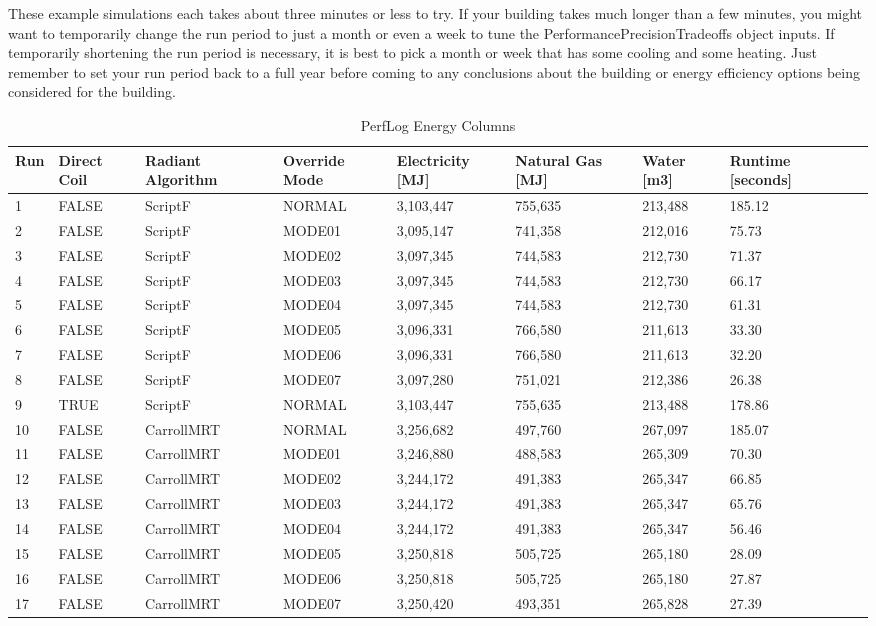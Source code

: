 These example simulations each takes about three minutes or less to try. If your building takes much longer than a few minutes, you might want to temporarily change the run period to just a month or even a week to tune the PerformancePrecisionTradeoffs object inputs. If temporarily shortening the run period is necessary, it is best to pick a month or week that has some cooling and some heating. Just remember to set your run period back to a full year before coming to any conclusions about the building or energy efficiency options being considered for the building.

{\scriptsize
\begin{longtable}[c]{p{0.2in}p{0.4in}p{0.6in}p{0.7in}p{0.5in}p{0.5in}p{0.7in}p{0.7in}p{0.65in}}
\caption{PerfLog Energy Columns\label{table:perflog_mode_columns}} \tabularnewline
\toprule
Run & 
Direct Coil & 
Radiant Algorithm & 
Override Mode & 
  Electricity {[}MJ{]} &
  Natural Gas {[}MJ{]} &
  Water {[}m3{]} &
  Runtime {[}seconds{]} \tabularnewline
\midrule
\endfirsthead

1  & FALSE & ScriptF  & NORMAL &  3,103,447 &	 755,635 &	 213,488 &	185.12 \tabularnewline
2  & FALSE & ScriptF  & MODE01 &  3,095,147 &	 741,358 &	 212,016 &	75.73  \tabularnewline
3  & FALSE & ScriptF  & MODE02 &  3,097,345 &	 744,583 &	 212,730 &	71.37  \tabularnewline
4  & FALSE & ScriptF  & MODE03 &  3,097,345 &	 744,583 &	 212,730 &	66.17  \tabularnewline
5  & FALSE & ScriptF  & MODE04 &  3,097,345 &	 744,583 &	 212,730 &	61.31  \tabularnewline
6  & FALSE & ScriptF  & MODE05 &  3,096,331 &	 766,580 &	 211,613 &	33.30  \tabularnewline
7  & FALSE & ScriptF  & MODE06 &  3,096,331 &	 766,580 &	 211,613 &	32.20  \tabularnewline
8  & FALSE & ScriptF  & MODE07 &  3,097,280 &	 751,021 &	 212,386 &	26.38  \tabularnewline
9  & TRUE  & ScriptF  & NORMAL &  3,103,447 &	 755,635 &	 213,488 &	178.86 \tabularnewline
10 & FALSE & CarrollMRT & NORMAL & 3,256,682& 	 497,760 &	 267,097 &	185.07 \tabularnewline
11 & FALSE & CarrollMRT & MODE01 & 3,246,880& 	 488,583 &	 265,309 &	70.30  \tabularnewline
12 & FALSE & CarrollMRT & MODE02 & 3,244,172& 	 491,383 &	 265,347 &	66.85  \tabularnewline
13 & FALSE & CarrollMRT & MODE03 & 3,244,172& 	 491,383 &	 265,347 &	65.76  \tabularnewline
14 & FALSE & CarrollMRT & MODE04 & 3,244,172& 	 491,383 &	 265,347 &	56.46  \tabularnewline
15 & FALSE & CarrollMRT & MODE05 & 3,250,818& 	 505,725 &	 265,180 &	28.09  \tabularnewline
16 & FALSE & CarrollMRT & MODE06 & 3,250,818& 	 505,725 &	 265,180 &	27.87  \tabularnewline
17 & FALSE & CarrollMRT & MODE07 & 3,250,420& 	 493,351 &	 265,828 &	27.39  \tabularnewline

\bottomrule
\end{longtable}
}


